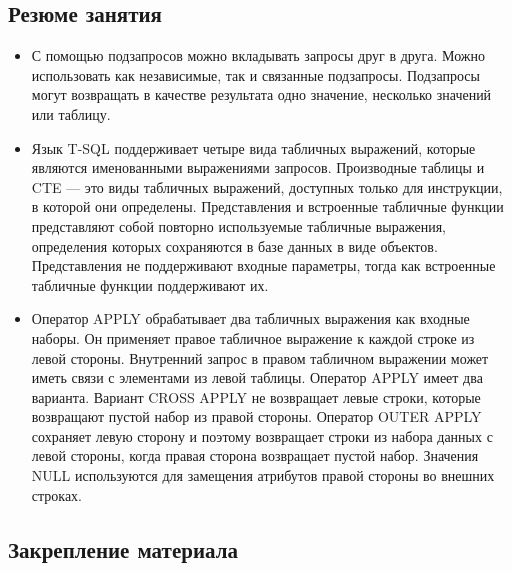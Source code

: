 \subsection*{Резюме занятия}
\begin{itemize}
	\item С помощью подзапросов можно вкладывать запросы друг в друга. Можно использовать как независимые, так и связанные подзапросы. Подзапросы могут
	возвращать в качестве результата одно значение, несколько значений или таблицу.
	\item Язык T-SQL поддерживает четыре вида табличных выражений, которые являются именованными выражениями запросов. Производные таблицы и CTE —
	это виды табличных выражений, доступных только для инструкции, в которой
	они определены. Представления и встроенные табличные функции представляют собой повторно используемые табличные выражения, определения которых
	сохраняются в базе данных в виде объектов. Представления не поддерживают
	входные параметры, тогда как встроенные табличные функции поддерживают
	их. 
	\item Оператор APPLY обрабатывает два табличных выражения как входные наборы.
	Он применяет правое табличное выражение к каждой строке из левой стороны.
	Внутренний запрос в правом табличном выражении может иметь связи с элементами из левой таблицы. Оператор APPLY имеет два варианта. Вариант CROSS
	APPLY не возвращает левые строки, которые возвращают пустой набор из правой
	стороны. Оператор OUTER APPLY сохраняет левую сторону и поэтому возвращает
	строки из набора данных с левой стороны, когда правая сторона возвращает
	пустой набор. Значения NULL используются для замещения атрибутов правой
	стороны во внешних строках. 
\end{itemize}


\subsection*{Закрепление материала}

